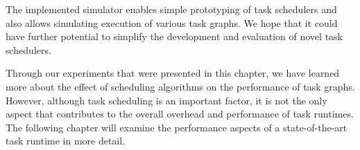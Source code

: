 The implemented \estee{} simulator enables simple prototyping of task schedulers and
also allows simulating execution of various task graphs. We hope that it could have further
potential to simplify the development and evaluation of novel task schedulers.

Through our experiments that were presented in this chapter, we have learned more about the effect
of scheduling algorithms on the performance of task graphs. However, although task scheduling is an
important factor, it is not the only aspect that contributes to the overall overhead and
performance of task runtimes. The following chapter will examine the performance aspects of a
state-of-the-art task runtime in more detail.
